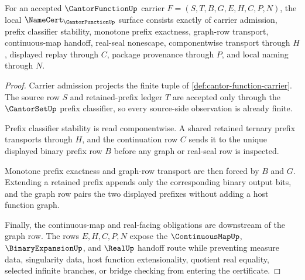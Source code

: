 \begin{theorem}
\label{thm:cantor-function-namecert-obligations}
For an accepted $\CantorFunctionUp$ carrier $F=(S,T,B,G,E,H,C,P,N)$, the local $\NameCert_{\CantorFunctionUp}$ surface consists exactly of carrier admission, prefix classifier stability, monotone prefix exactness, graph-row transport, continuous-map handoff, real-seal nonescape, componentwise transport through $H$, displayed replay through $C$, package provenance through $P$, and local naming through $N$.
\end{theorem}
\begin{proof}
Carrier admission projects the finite tuple of \autoref{def:cantor-function-carrier}. The source row $S$ and retained-prefix ledger $T$ are accepted only through the $\CantorSetUp$ prefix classifier, so every source-side observation is already finite.

Prefix classifier stability is read componentwise. A shared retained ternary prefix transports through $H$, and the continuation row $C$ sends it to the unique displayed binary prefix row $B$ before any graph or real-seal row is inspected.

Monotone prefix exactness and graph-row transport are then forced by $B$ and $G$. Extending a retained prefix appends only the corresponding binary output bits, and the graph row pairs the two displayed prefixes without adding a host function graph.

Finally, the continuous-map and real-facing obligations are downstream of the graph row. The rows $E,H,C,P,N$ expose the $\ContinuousMapUp$, $\BinaryExpansionUp$, and $\RealUp$ handoff route while preventing measure data, singularity data, host function extensionality, quotient real equality, selected infinite branches, or bridge checking from entering the certificate.
\end{proof}

